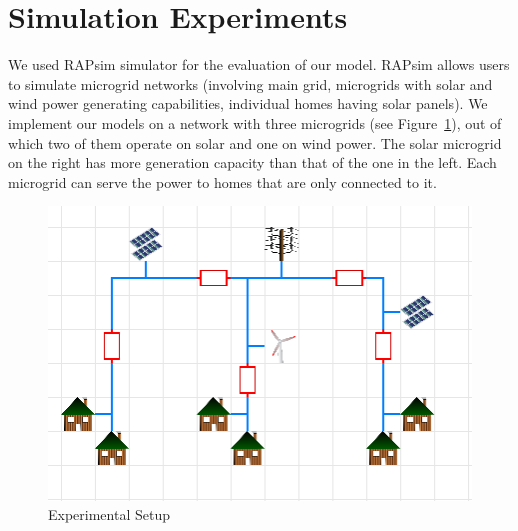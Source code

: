 \section{Simulation Experiments}\label{sec:experiments}
We used  RAPsim  simulator  \cite{rapsim} for the evaluation of our model. RAPsim allows users to simulate microgrid networks (involving main grid, microgrids with solar and wind power generating capabilities, individual homes having solar panels). We implement our models on a network with three microgrids (see Figure~\ref{exp}), out of which two of them operate on solar and one on wind power. The solar microgrid on the right has more generation capacity than that of the one in the left. Each microgrid can serve the power to homes that are only connected to it. 


\begin{figure}[thbp]
	\centering
	\includegraphics [scale = 0.6]{experimental_setup.jpg}
        \caption{Experimental Setup}
	\label{exp}
\end{figure}
